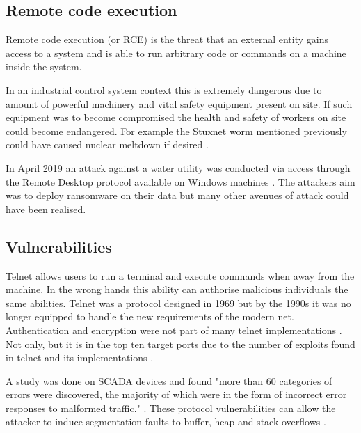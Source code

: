 \documentclass{article}
\begin{document}
\begin{multicols}{2}

    \section{Remote code execution}
    Remote code execution (or RCE)
    is the threat that an external entity gains access to a
    system and is able to run arbitrary code or commands on a machine inside the
    system.

    In an industrial control system context this is extremely dangerous due to
    amount of
    powerful machinery and vital safety equipment present on site. 
    If such equipment
    was to become compromised the health and safety of workers on site could
    become endangered. For example the Stuxnet worm mentioned previously
    could have caused nuclear
    meltdown if desired \cite{stuxnet}.

    In April 2019 an attack against a water utility was conducted via access through
    the Remote Desktop protocol available on Windows machines \cite{kapersky}.
    The attackers aim was to deploy ransomware on their data but many other avenues
    of attack could have been realised.

    \subsection{Vulnerabilities}
    Telnet allows users to run a terminal and execute commands when away from the
    machine. In the wrong hands this ability can authorise malicious individuals the
    same abilities.
    Telnet was a protocol designed in 1969 but by the 1990s 
    it was no longer equipped to
    handle the new requirements of the modern net.
    Authentication and encryption were not
    part of many telnet implementations \cite{telnet}. Not only, 
    but it is in the
    top ten target ports due to the number of exploits found in telnet and its
    implementations \cite{telnet}.

    A study was done on SCADA devices and found "more than 60 categories of errors
    were discovered, the majority of which were in the form of incorrect error
    responses to malformed traffic." \cite{shaky}. These protocol vulnerabilities
    can allow the attacker to induce segmentation
    faults to buffer, heap and stack overflows \cite{shaky} \cite{scada}.


\end{multicols}
\end{document}
